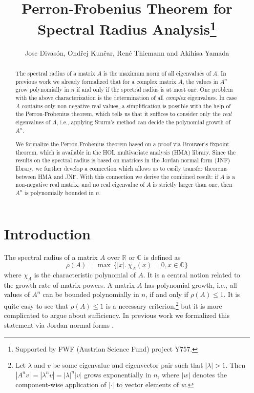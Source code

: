 \documentclass[11pt,a4paper]{article}
\newcommand\reals{\mathbb{R}}
\newcommand\complex{\mathbb{C}}
\begin{document}
\title{Perron-Frobenius Theorem for Spectral Radius Analysis\footnote{Supported by FWF (Austrian Science Fund) project Y757.}}
\author{Jose Divas\'on, Ondřej Kunčar, Ren\'e Thiemann and Akihisa Yamada}
\maketitle

\begin{abstract}
The spectral radius of a matrix $A$ is the maximum
norm of all eigenvalues of $A$. In previous work we already formalized that 
for a complex matrix $A$, the values in $A^n$ grow polynomially in $n$ if and only if the spectral radius is 
at most one.
One problem with the above characterization is the determination of all \emph{complex} eigenvalues.
In case $A$ contains only non-negative real values, a simplification is possible with the help of
the Perron-Frobenius theorem, which tells us that 
it suffices to consider only the \emph{real} eigenvalues of $A$, i.e., 
applying Sturm's method can decide the polynomial growth of $A^n$.

We formalize the Perron-Frobenius theorem based on a proof via Brouwer's fixpoint theorem, which
is available in the HOL multivariate analysis (HMA) library. Since the results on the spectral
radius is based on matrices in the Jordan normal form (JNF) library, we further develop
a connection which allows us to easily transfer theorems between HMA and JNF. 
With this connection we derive the combined result: if $A$ is a non-negative real matrix,
and no real eigenvalue of $A$ is strictly larger than one, then $A^n$ is polynomially bounded in $n$.
\end{abstract}

\tableofcontents

\section{Introduction}

The spectral radius of a matrix $A$ over $\reals$ or $\complex$ 
is defined as \begin{equation*}
\rho(A) = \max\,\{|x| .\ \chi_A(x) = 0, x \in \complex\}
\end{equation*} 
where
$\chi_A$ is the characteristic polynomial of $A$. It is a central notion related to the growth rate
of matrix powers. A matrix $A$ has polynomial growth, i.e., 
all values of $A^n$ can be bounded polynomially in $n$, if and only if $\rho(A) \leq 1$.
It is quite easy to see that $\rho(A) \leq 1$ is a  necessary criterion,\footnote{
Let $\lambda$ and $v$ be some eigenvalue and eigenvector pair such that $|\lambda| > 1$. Then
$|A^n v| = |\lambda^n v| = |\lambda|^n |v|$ grows exponentially in $n$, where $|w|$ denotes the component-wise
application of $|\cdot|$ to vector elements of $w$.}
but it is more complicated to argue about sufficiency.
In previous work we formalized this statement via Jordan normal forms
\cite{JNF}.
\end{document}
